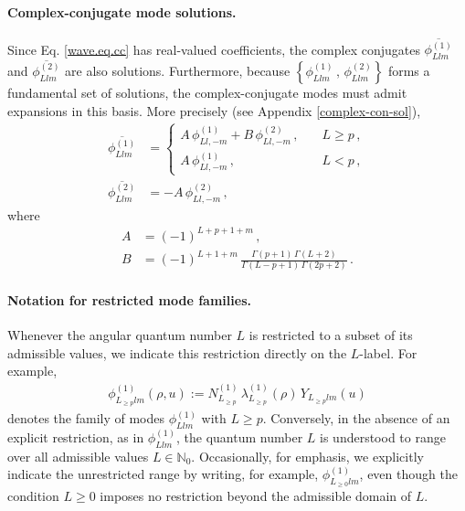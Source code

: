 \documentclass[aps,twocolumn,nofootinbib]{revtex4}
\begin{document}
\paragraph{Complex-conjugate mode solutions.} Since Eq. \eqref{wave.eq.cc} has real-valued coefficients, the complex conjugates $\overline{\phi^{(1)}_{Llm}}$ and $\overline{\phi^{(2)}_{Llm}}$ are also solutions. Furthermore, because $\left\{ \phi^{(1)}_{Llm} \,,\, \phi^{(2)}_{Llm} \right\}$ forms a fundamental set of solutions, the complex-conjugate modes must admit expansions in this basis. More precisely (see Appendix \ref{complex-con-sol}),
\begin{align}
    \overline{\phi^{(1)}_{Llm}} &= 
    \begin{cases}
        A \,\phi^{(1)}_{Ll,-m} + B \,\phi^{(2)}_{Ll,-m}\,, \quad &L \geqslant p \,,\\[7pt]
        A\, \phi^{(1)}_{Ll,-m}\,, \quad &L < p \,,
    \end{cases} \label{complex(1)}\\[4pt]
    \overline{\phi^{(2)}_{Llm}} &= - A \,\phi^{(2)}_{Ll,-m}\,, \label{complex(2)}
\end{align}
where
\begin{align}
    A &= (-1)^{L+p+1+m} \,, \\[3pt]
    B &= {(-1)^{L+1+m}} \,\frac{\Gamma(p+1) \, \Gamma(L+2)}{\Gamma(L-p+1)\, \Gamma(2p+2)} \,.
\end{align}

\paragraph{Notation for restricted mode families.} Whenever the angular quantum number $L$ is restricted to a subset of its admissible values, we indicate this restriction directly on the $L$-label. For example,
\begin{align}
    \phi^{(1)}_{L^{}_{\geqslant p}lm}(\rho,u) := N^{(1)}_{L^{}_{\geqslant p}}\, \lambda^{(1)}_{L^{}_{\geqslant p}}(\rho)\, Y^{}_{L^{}_{\geqslant p}lm}(u)
\end{align}
denotes the family of modes $\phi^{(1)}_{Llm}$ with $L\geqslant p$. Conversely, in the absence of an explicit restriction, as in $\phi^{(1)}_{Llm}$, the quantum number $L$ is understood to range over all admissible values $L\in\mathbb N_0$. Occasionally, for emphasis, we explicitly indicate the unrestricted range by writing, for example, $\phi^{(1)}_{L^{}_{\geqslant 0}lm}$, even though the condition $L\geqslant 0$ imposes no restriction beyond the admissible domain of $L$.
\end{document}
